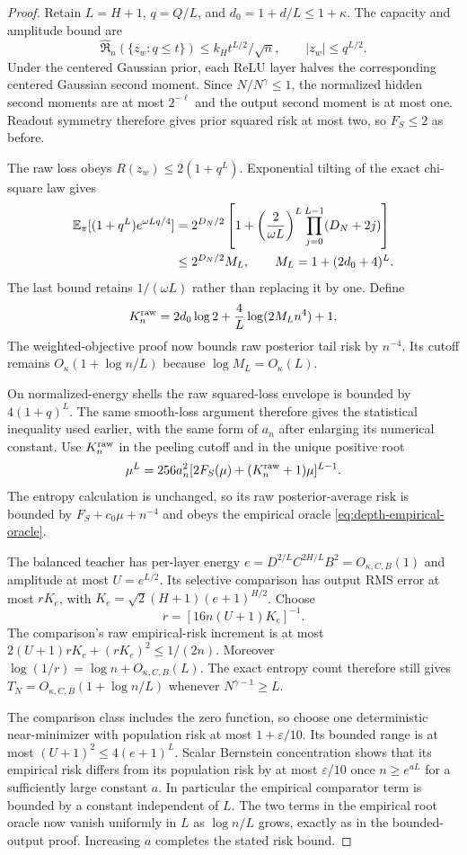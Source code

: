\begin{proof}
Retain $L=H+1$, $q=Q/L$, and $d_0=1+d/L\le1+\kappa$.
The capacity and amplitude bound are
\[
 \widehat{\mathfrak R}_n(\{z_w:q\le t\})\le k_Ht^{L/2}/\sqrt n,
 \qquad |z_w|\le q^{L/2}.
\]
Under the centered Gaussian prior, each ReLU layer halves the corresponding centered Gaussian second moment. Since $N/N^\gamma\le1$, the normalized hidden second moments are at most $2^{-\ell}$ and the output second moment is at most one. Readout symmetry therefore gives prior squared risk at most two, so $F_S\le2$ as before.

The raw loss obeys $R(z_w)\le2(1+q^L)$. Exponential tilting of the exact chi-square law gives
\begin{align*}
 \mathbb E_\pi[(1+q^L)e^{\omega Lq/4}]
 &=2^{D_N/2}\left[1+
       \left(\frac2{\omega L}\right)^L
                         \prod_{j=0}^{L-1}(D_N+2j)\right]\\
 &\le2^{D_N/2}M_L,
 \qquad M_L=1+(2d_0+4)^L.
\end{align*}
The last bound retains $1/(\omega L)$ rather than replacing it by one. Define
\[
 K_n^{\rm raw}=2d_0\log2+\frac4L\log(2M_Ln^4)+1.
\]
The weighted-objective proof now bounds raw posterior tail risk by $n^{-4}$. Its cutoff remains
$O_\kappa(1+\log n/L)$ because $\log M_L=O_\kappa(L)$.

On normalized-energy shells the raw squared-loss envelope is bounded by $4(1+q)^L$. The same smooth-loss argument therefore gives the statistical inequality used earlier, with the same form of $a_n$ after enlarging its numerical constant. Use $K_n^{\rm raw}$ in the peeling cutoff and in the unique positive root
\[
 \mu^L=256a_n^2[2F_S(\mu)+(K_n^{\rm raw}+1)\mu]^{L-1}.
\]
The entropy calculation is unchanged, so its raw posterior-average risk is bounded by $F_S+c_0\mu+n^{-4}$ and obeys the empirical oracle \eqref{eq:depth-empirical-oracle}.

The balanced teacher has per-layer energy
$e=D^{2/L}C^{2H/L}B^2=O_{\kappa,C,B}(1)$ and amplitude at most
$U=e^{L/2}$. Its selective comparison has output RMS error at most $rK_e$, with $K_e=\sqrt2(H+1)(e+1)^{H/2}$. Choose
\[
 r=[16n(U+1)K_e]^{-1}.
\]
The comparison's raw empirical-risk increment is at most
$2(U+1)rK_e+(rK_e)^2\le1/(2n)$.
Moreover $\log(1/r)=\log n+O_{\kappa,C,B}(L)$. The exact entropy count therefore still gives
$T_N=O_{\kappa,C,B}(1+\log n/L)$ whenever $N^{\gamma-1}\ge L$.

The comparison class includes the zero function, so choose one deterministic near-minimizer with population risk at most $1+\varepsilon/10$. Its bounded range is at most $(U+1)^2\le4(e+1)^L$. Scalar Bernstein concentration shows that its empirical risk differs from its population risk by at most $\varepsilon/10$ once $n\ge e^{aL}$ for a sufficiently large constant $a$. In particular the empirical comparator term is bounded by a constant independent of $L$. The two terms in the empirical root oracle now vanish uniformly in $L$ as $\log n/L$ grows, exactly as in the bounded-output proof. Increasing $a$ completes the stated risk bound.


\end{proof}

